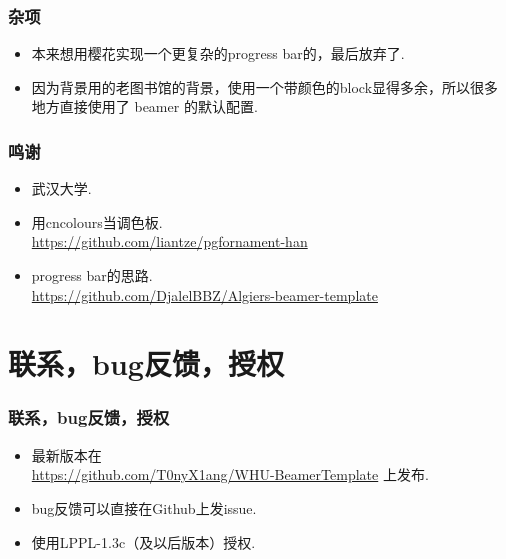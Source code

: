 \documentclass{beamer}
\begin{document}
\begin{frame}
    \frametitle{杂项}
    \begin{itemize}
        \item 本来想用樱花实现一个更复杂的progress bar的，最后放弃了.
        \item 因为背景用的老图书馆的背景，使用一个带颜色的block显得多余，所以很多地方直接使用了 beamer 的默认配置.
    \end{itemize}
\end{frame}

\begin{frame}
    \frametitle{鸣谢}
    \begin{itemize}
        \item 武汉大学.
        \item 用cncolours当调色板. \\ \url{https://github.com/liantze/pgfornament-han}
        \item progress bar的思路. \\ \url{https://github.com/DjalelBBZ/Algiers-beamer-template} 
    \end{itemize}
\end{frame}

\section{联系，bug反馈，授权}
\begin{frame}
    \frametitle{联系，bug反馈，授权}
    \begin{itemize}
        \item 最新版本在 \\ \url{https://github.com/T0nyX1ang/WHU-BeamerTemplate} 上发布.
        \item bug反馈可以直接在Github上发issue.
        \item 使用LPPL-1.3c（及以后版本）授权.
    \end{itemize}
\end{frame}
\end{document}
